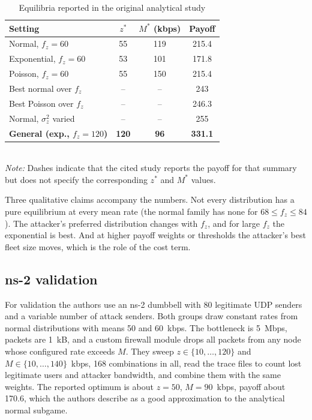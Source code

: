 \documentclass[conference]{IEEEtran}
\begin{document}
\begin{table}[t]
\caption{Equilibria reported in the original analytical study}
\label{tab:reported}
\centering\footnotesize
\begin{tabular}{lccc}
\toprule
Setting & $z^*$ & $M^*$ (kbps) & Payoff\\
\midrule
Normal, $f_z{=}60$ & 55 & 119 & 215.4\\
Exponential, $f_z{=}60$ & 53 & 101 & 171.8\\
Poisson, $f_z{=}60$ & 55 & 150 & 215.4\\
Best normal over $f_z$ & -- & -- & 243\\
Best Poisson over $f_z$ & -- & -- & 246.3\\
Normal, $\sigma_z^2$ varied & -- & -- & 255\\
\textbf{General (exp., $f_z{=}120$)} & \textbf{120} & \textbf{96} & \textbf{331.1}\\
\bottomrule
\end{tabular}\\[2pt]
{\scriptsize\emph{Note:} Dashes indicate that the cited study reports the payoff for that summary but does not specify the corresponding $z^*$ and $M^*$ values.}
\end{table}

Three qualitative claims accompany the numbers. Not every distribution has a pure equilibrium at every mean rate (the normal family has none for $68\le f_z\le84$). The attacker's preferred distribution changes with $f_z$, and for large $f_z$ the exponential is best. And at higher payoff weights or thresholds the attacker's best fleet size moves, which is the role of the cost term.

\subsection{ns-2 validation}
For validation the authors use an ns-2 dumbbell with 80 legitimate UDP senders and a variable number of attack senders. Both groups draw constant rates from normal distributions with means 50 and 60~kbps. The bottleneck is 5~Mbps, packets are 1~kB, and a custom firewall module drops all packets from any node whose configured rate exceeds $M$. They sweep $z\in\{10,\dots,120\}$ and $M\in\{10,\dots,140\}$~kbps, 168 combinations in all, read the trace files to count lost legitimate users and attacker bandwidth, and combine them with the same weights. The reported optimum is about $z{=}50$, $M{=}90$~kbps, payoff about 170.6, which the authors describe as a good approximation to the analytical normal subgame.
\end{document}
